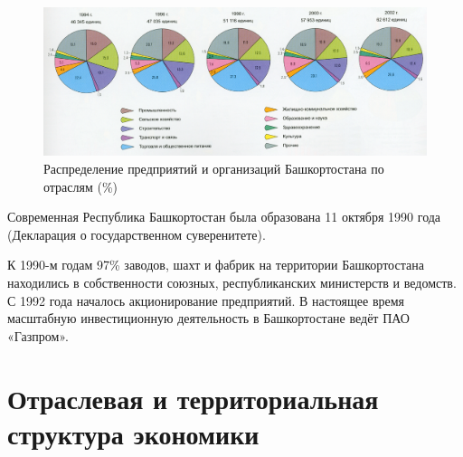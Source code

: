 \begin{figure}[h!]
\includegraphics[width=1\linewidth]{pics/sasha/industries} 
\caption{Распределение предприятий и организаций Башкортостана по отраслям (\%)}
\end{figure}

Современная Республика Башкортостан была образована 11 октября 1990 года (Декларация о государственном суверенитете). 

К 1990-м годам 97\% заводов, шахт и фабрик на территории Башкортостана находились в собственности союзных, республиканских министерств и ведомств. С 1992 года началось акционирование предприятий. В настоящее время масштабную инвестиционную деятельность в Башкортостане ведёт ПАО «Газпром». 

\section{Отраслевая и территориальная структура экономики}

